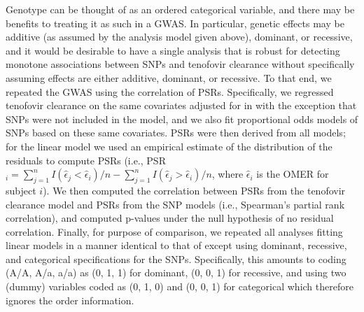 \documentclass[12pt, usenatbib]{article}
\begin{document}
Genotype can be thought of as an ordered categorical variable, and there may be benefits to treating it as such in a GWAS.  In particular, genetic effects may be additive (as assumed by the analysis model given above), dominant, or recessive, and it would be desirable to have a single analysis that is robust for detecting monotone associations between SNPs and tenofovir clearance without specifically assuming effects are either additive, dominant, or recessive.  To that end, we repeated the GWAS using the correlation of PSRs.  Specifically, we regressed tenofovir clearance on the same covariates adjusted for in \cite{wanga2015} with the exception that SNPs were not included in the model, and we also fit proportional odds models of SNPs based on these same covariates.  PSRs were then derived from all models; for the linear model we used an empirical estimate of the distribution of the residuals to compute PSRs (i.e., PSR$_i = \sum_{j=1}^n I(\hat \epsilon_j < \hat \epsilon_i)/n - \sum_{j=1}^nI(\hat \epsilon_j > \hat \epsilon_i)/n$, where $\hat \epsilon_i$ is the OMER for subject $i$).  We then computed the correlation between PSRs from the tenofovir clearance model and PSRs from the SNP models (i.e., Spearman's partial rank correlation), and computed p-values under the null hypothesis of no residual correlation.  Finally, for purpose of comparison, we repeated all analyses fitting linear models in a manner identical to that of \cite{wanga2015} except using dominant, recessive, and categorical specifications for the SNPs.  Specifically, this amounts to coding (A/A, A/a, a/a) as (0, 1, 1) for dominant, (0, 0, 1) for recessive, and using two (dummy) variables coded as (0, 1, 0) and (0, 0, 1) for categorical which therefore ignores the order information.
\end{document}
